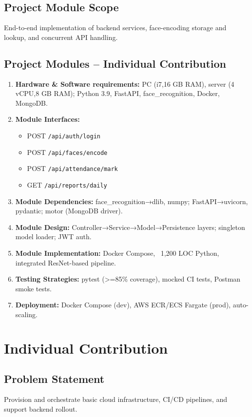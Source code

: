 \documentclass[openany]{report}
\begin{document}
\section{Project Module Scope}
End-to-end implementation of backend services, face-encoding storage and lookup, and concurrent API handling.

\section{Project Modules – Individual Contribution}
\begin{enumerate}
  \item \textbf{Hardware \& Software requirements:} PC (i7,16 GB RAM), server (4 vCPU,8 GB RAM); Python 3.9, FastAPI, face\_recognition, Docker, MongoDB.
  \item \textbf{Module Interfaces:} 
    \begin{itemize}
      \item POST \texttt{/api/auth/login}
      \item POST \texttt{/api/faces/encode}
      \item POST \texttt{/api/attendance/mark}
      \item GET  \texttt{/api/reports/daily}
    \end{itemize}
  \item \textbf{Module Dependencies:} face\_recognition→dlib, numpy; FastAPI→uvicorn, pydantic; motor (MongoDB driver).
  \item \textbf{Module Design:} Controller→Service→Model→Persistence layers; singleton model loader; JWT auth.
  \item \textbf{Module Implementation:} Docker Compose, ~1,200 LOC Python, integrated ResNet-based pipeline.
  \item \textbf{Testing Strategies:} pytest (>=85\% coverage), mocked CI tests, Postman smoke tests.
  \item \textbf{Deployment:} Docker Compose (dev), AWS ECR/ECS Fargate (prod), auto-scaling.
\end{enumerate}

\chapter{Individual Contribution}

\section{Problem Statement}
Provision and orchestrate basic cloud infrastructure, CI/CD pipelines, and support backend rollout.
\end{document}
